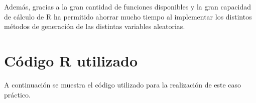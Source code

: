 \documentclass[12pt,a4paper,twoside,openright,titlepage,final]{article}
\begin{document}
Además, gracias a la gran cantidad de funciones disponibles y la gran capacidad de cálculo de R ha permitido ahorrar mucho tiempo al implementar los distintos métodos de generación de las distintas variables aleatorias.

\newpage

\section{Código R utilizado}

A continuación se muestra el código utilizado para la realización de este caso práctico.

\inputminted{r}{../codigo/caso_ii.R}
\end{document}
